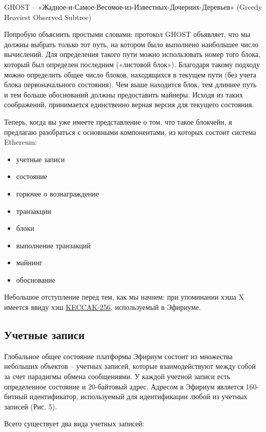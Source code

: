 \documentclass{article}
\begin{document}
GHOST – «Жадное-и-Самое-Весомое-из-Известных-Дочерних-Деревьев» (Greedy Heaviest Observed Subtree)

Попробую объяснить простыми словами: протокол GHOST объявляет, что мы должны выбрать только тот путь, на котором было выполнено наибольшее число вычислений. Для определения такого пути можно использовать номер того блока, который был определен последним («листовой блок»). Благодаря такому подходу можно определить общее число блоков, находящихся в текущем пути (без учета блока первоначального состояния). Чем выше находится блок, тем длиннее путь и тем больше обоснований должны предоставить майнеры. Исходя из таких соображений, принимается единственно верная версия для текущего состояния. 

Теперь, когда вы уже имеете представление о том, что такое блокчейн, я предлагаю разобраться с основными компонентами, из которых состоит система Ethereum:

\begin{itemize}
 \item учетные записи 
 \item состояние
 \item горючее о вознаграждение
 \item транзакции
 \item блоки
 \item выполнение транзакций
 \item майнинг
 \item обоснование
\end{itemize}

Небольшое отступление перед тем, как мы начнем: при упоминании хэша X имеется ввиду хэш 
\href{https://ethereum.stackexchange.com/questions/550/which-cryptographic-hash-function-does-ethereum-use}{KECCAK-256}, используемый в Эфириуме.

\subsection{Учетные записи}

Глобальное общее состояние платформы Эфириум состоит из множества небольших объектов – учетных записей, которые взаимодействуют между собой за счет парадигмы обмена сообщениями. У каждой учетной записи есть определенное состояние и 20-байтовый адрес. Адресом в Эфириум является 160-битный идентификатор, используемый для идентификации любой из учетных записей (Рис. 5).

Всего существует два вида учетных записей:
\end{document}
